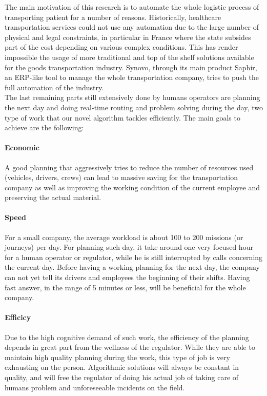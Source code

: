 \documentclass[12pt]{memoir}
\begin{document}
\label{sec:Context of research}
The main motivation of this research is to automate the whole logistic process of
transporting patient for a number of reasons. Historically, healthcare transportation
services could not use any automation due to the large number of physical and legal
constraints, in particular in France where the state subsides part of the cost
depending on various complex conditions. This has render impossible the usage of
more traditional and top of the shelf solutions available for the goods
transportation industry. Synovo, through its main product Saphir, an ERP-like tool
to manage the whole transportation company, tries to push the full automation of the
industry. \\
The last remaining parts still extensively done by humans operators are planning the
next day and doing real-time routing and problem solving during the day, two type of
work that our novel algorithm tackles efficiently. The main goals to achieve are the
following:
\paragraph{Economic} %
\label{par:Economic}
A good planning that aggressively tries to reduce the number of resources used
(vehicles, drivers, crews) can lead to massive saving for the transportation company
as well as improving the working condition of the current employee and preserving
the actual material.
\paragraph{Speed} %
\label{par:Speed}
For a small company, the average workload is about 100 to 200 missions (or journeys)
per day. For planning such day, it take around one very focused hour for a human
operator or regulator, while he is still interrupted by calls concerning the current
day. Before having a working planning for the next day, the company can not yet
tell its drivers and employees the beginning of their shifts. Having fast answer,
in the range of 5 minutes or less, will be beneficial for the whole company.
\paragraph{Efficicy} %
\label{par:Efficicy}
Due to the high cognitive demand of such work, the efficiency of the planning depends
in great part from the wellness of the regulator. While they are able to maintain
high quality planning during the work, this type of job is very exhausting on
the person. Algorithmic solutions will always be constant in quality, and will
free the regulator of doing his actual job of taking care of humans problem and
unforeseeable incidents on the field.
\end{document}
